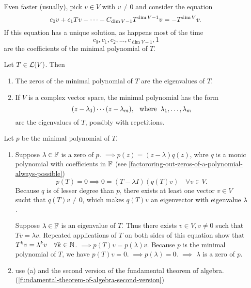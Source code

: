Even faster (usually), pick $v \in V$ with $v \neq 0$ and consider the equation 
\begin{equation}
  c_0v + c_1Tv + \cdots + C_{\operatorname{dim} V-1}T^{\operatorname{dim} V-1}v=-T^{\operatorname{dim} V}v.
\end{equation}
If this equation has a unique solution, as happens most of the time 
\begin{equation}
  c_0, c_1, c_2, \dots, c_{\dim V-1}, 1
\end{equation}
are the coefficients of the minimal polynomial of $T$.

\setcounter{thm}{26}
\begin{thm} 
  \label{thm: eigenvalues are the zeros of the minimal polynomial}
  Let $T \in \mathcal{L}(V)$. Then
  \begin{enumerate}[label=(\alph*)]
    \item The zeros of the minimal polynomial of $T$ are the eigenvalues of $T$.
    \item If $V$ is a complex vector space, the minimal polynomial has the form 
    \begin{equation}
      (z-\lambda_1)\cdots(z-\lambda_m), \;\;\, \text{where}\;\; \lambda_1, \dots, \lambda_m
    \end{equation} are the eigenvalues of $T$, possibly with repetitions.
  \end{enumerate}
\end{thm}
\begin{prf} Let $p$ be the minimal polynomial of $T$.
  \begin{enumerate}[label=(\alph*)]
    \item Suppose $\lambda \in \mathbb{F}$ is a zero of $p$. $\implies p(z)=(z-\lambda)q(z)$, whre $q$ is a monic polynomial with coefficients in $\mathbb{F}$ (see \ref{factororing-out-zeros-of-a-polynomial-always-possible})
    \begin{equation}
      p(T)=0\implies 0=(T-\lambda I)(q(T)v) \quad \forall v\in V.
    \end{equation}
    Because $q$ is of lesser degree than $p$, there exists at least one vector $v\in V$ sucht that $q(T)v \neq 0$, which makes $q(T)v$ an eigenvector with eigenvalue $\lambda$.
    
    Suppose $\lambda \in \mathbb{F}$ is an eigenvalue of $T$. Thus there exists $v\in V, v \neq 0$ such that $Tv=\lambda v$. Repeated applications of $T$ on both sides of this equation show that $T^kv =\lambda^k v \quad \forall k\in \mathbb{N}$.
    $\implies p(T)v=p(\lambda)v$. Because $p$ is the minimal polynomial of $T$, we have $p(T)v=0$. $\implies p(\lambda) = 0$. $\implies$ $\lambda$ is a zero of $p$.
    
    \item use (a) and the second version of the fundamental theorem of algebra. (\ref{fundamental-theorem-of-algebra-second-version})
  \end{enumerate}
\end{prf}

